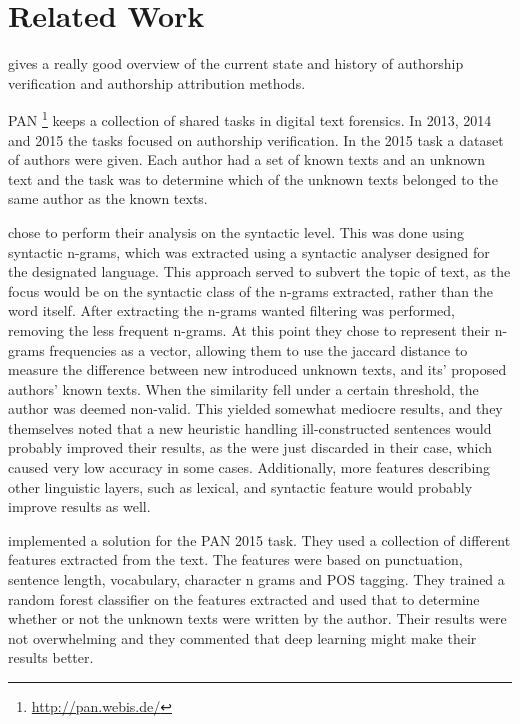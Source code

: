 \section{Related Work}
\cite{stamatos2009} gives a really good overview of the current state and
history of authorship verification and authorship attribution methods.

PAN \footnote{\url{http://pan.webis.de/}} keeps a collection of shared tasks in
digital text forensics. In 2013, 2014 and 2015 the tasks focused on authorship
verification. In the 2015 task a dataset of authors were given. Each author had
a set of known texts and an unknown text and the task was to determine which of
the unknown texts belonged to the same author as the known texts.

\cite{juanpablo2015} chose to perform their analysis on the syntactic level.
This was done using syntactic n-grams, which was extracted using a syntactic
analyser designed for the designated language. This approach served to subvert
the topic of text, as the focus would be on the syntactic class of the n-grams
extracted, rather than the word itself. After extracting the n-grams wanted
filtering was performed, removing the less frequent n-grams. At this point they
chose to represent their n-grams frequencies as a vector, allowing them to use
the jaccard distance to measure the difference between new introduced unknown
texts, and its' proposed authors' known texts. When the similarity fell under
a certain threshold, the author was deemed non-valid. This yielded somewhat
mediocre results, and they themselves noted that a new heuristic handling
ill-constructed sentences would probably improved their results, as the were
just discarded in their case, which caused very low accuracy in some cases.
Additionally, more features describing other linguistic layers, such as lexical,
and syntactic feature would probably improve results as well.

\cite{maitra2015} implemented a solution for the PAN 2015 task. They used a
collection of different features extracted from the text. The features were
based on punctuation, sentence length, vocabulary, character n grams and
\gls{POS} tagging. They trained a random forest classifier on the features
extracted and used that to determine whether or not the unknown texts were
written by the author. Their results were not overwhelming and they commented
that deep learning might make their results better.

